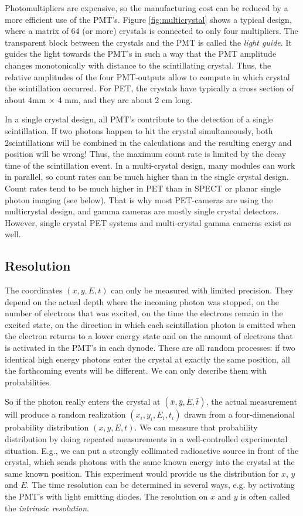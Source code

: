 Photomultipliers are expensive, so the manufacturing cost can be
reduced by a more efficient use of the PMT's. Figure
\ref{fig:multicrystal} shows a typical design, where a matrix of 64
(or more) crystals is connected to only four multipliers. The
transparent block between the crystals and the PMT is called the {\em
light guide}.  It guides the light towards the PMT's in such a way
that the PMT amplitude changes monotonically with distance to the
scintillating crystal. Thus, the relative amplitudes of the four
PMT-outputs allow to compute in which crystal the scintillation
occurred. For PET, the crystals have typically a cross section of
about 4mm $\times$ 4 mm, and they are about 2 cm long.

In a single crystal design, all PMT's contribute to the detection of a single
scintillation. If two photons happen to hit the crystal simultaneously, both
2scintillations will be combined in the calculations and the resulting energy
and position will be wrong! Thus, the maximum count rate is limited by the
decay time of the scintillation event. In a multi-crystal design, many modules
can work in parallel, so count rates can be much higher than in the single
crystal design. Count rates tend to be much higher in PET than in SPECT or
planar single photon imaging (see below). That is why most PET-cameras are
using the multicrystal design, and gamma cameras are mostly single crystal
detectors. However, single crystal PET systems and multi-crystal gamma cameras
exist as well.


\subsection{Resolution \label{sec:resolution}}
The coordinates $(x, y, E, t)$ can only be measured with limited precision.
They depend on the actual depth where the incoming photon was stopped, on
the number of electrons that was excited, on the time the electrons remain
in the excited state, on the direction in which each scintillation photon is
emitted when the electron returns to a lower energy state and on the amount of
electrons that is activated in the PMT's in each dynode. These are all
random processes: if two identical high energy photons enter the crystal at
exactly the same position, all the forthcoming events will be different. We
can only describe them with probabilities.

So if the photon really enters the crystal at $(\bar{x}, \bar{y}, \bar{E},
\bar{t})$, the actual measurement will produce a random realization $(x_i,
y_i, E_i, t_i)$ drawn from a four-dimensional probability distribution
$(x, y, E, t)$. We can measure that probability distribution by doing
repeated measurements in a well-controlled experimental situation. E.g., we
can put a strongly collimated radioactive source in front of the crystal,
which sends photons with the same known energy into the crystal at the same
known position. This experiment would provide us the distribution for $x$,
$y$ and $E$. The time resolution can be determined in several ways, e.g. by
activating the PMT's with light emitting diodes. The resolution on $x$ and $y$
is often called the {\em intrinsic resolution}.

